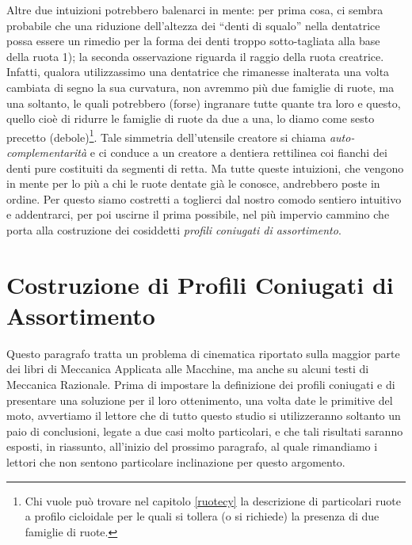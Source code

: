 \noindent Altre due intuizioni potrebbero balenarci in mente:
per prima cosa, ci sembra probabile che una riduzione
dell'altezza dei ``denti di squalo'' nella dentatrice possa essere un rimedio
per la forma dei denti
troppo sotto-tagliata alla base della ruota 1); la seconda osservazione
riguarda il raggio della ruota creatrice.
Infatti, qualora utilizzassimo una dentatrice
che rimanesse inalterata
una volta cambiata di segno la
sua curvatura, non avremmo pi\`u due famiglie di
ruote, ma una soltanto, le quali potrebbero (forse) ingranare tutte
quante tra loro e questo, quello cio\`e di ridurre le famiglie di ruote da due
a una, lo diamo come sesto precetto (debole)\footnote{Chi vuole
pu\`o trovare nel capitolo \ref{ruotecy} 
la descrizione di particolari ruote a profilo
cicloidale per le quali si tollera (o si richiede)
la presenza di due famiglie di ruote.}.
Tale simmetria  dell'utensile creatore si chiama
{\em auto-complementarit\`a} e
ci conduce  a un creatore a
dentiera rettilinea coi fianchi dei denti pure costituiti da segmenti di retta.
Ma tutte queste intuizioni, che vengono in mente per lo pi\`u a chi le ruote
dentate gi\`a le conosce, 
andrebbero poste in ordine. Per questo siamo costretti
 a toglierci dal nostro comodo sentiero intuitivo
e addentrarci, per poi uscirne il prima possibile, nel pi\`u impervio cammino
che porta alla costruzione dei cosiddetti {\em profili coniugati di
assortimento}.

\section{Costruzione di Profili Coniugati di Assortimento} \label{prof_con}

\noindent Questo paragrafo tratta un problema di cinematica riportato
sulla maggior parte dei
 libri di Meccanica Applicata alle Macchine, ma anche su
alcuni testi di Meccanica Razionale. Prima di 
impostare la definizione dei profili coniugati e di presentare una soluzione
per il loro ottenimento, una volta date le primitive del moto, avvertiamo
il lettore che di tutto questo studio si utilizzeranno soltanto un paio di
conclusioni, legate a due casi molto particolari,
e che tali risultati saranno 
esposti, in riassunto, all'inizio del prossimo paragrafo, al quale rimandiamo
i lettori che non sentono particolare inclinazione per questo argomento.

